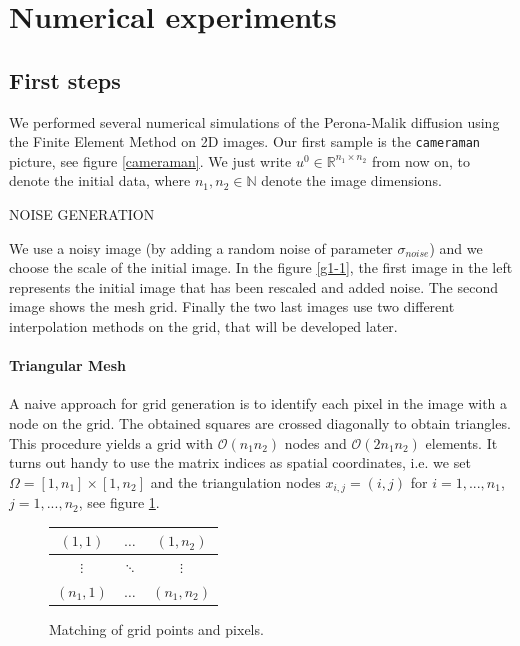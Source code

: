 \documentclass{report}
\renewcommand\O{\mathcal{O}}
\def\N{\mathbb{N}}
\def\R{\mathbb{R}}
\begin{document}
\section{Numerical experiments}

\subsection{First steps} 

We performed several numerical simulations of the Perona-Malik diffusion using the Finite Element Method on 2D images. Our first sample is the \texttt{cameraman} picture, see figure \ref{cameraman}. We just write $u^0 \in \R^{n_1 \times n_2}$ from now on, to denote the initial data, where $n_1, n_2 \in \N$ denote the image dimensions.

NOISE GENERATION

We use a noisy image (by adding a random noise of parameter ${\sigma}_{noise}$) and we choose the scale of the initial image. In the figure \ref{g1-1}, the first image in the left represents the initial image that has been rescaled and added noise. The second image shows the mesh grid. Finally the two last images use two different interpolation methods on the grid, that will be developed later. \\

\paragraph{Triangular Mesh}

A naive approach for grid generation is to identify each pixel in the image with a node on the grid. The obtained squares are crossed diagonally to obtain triangles. This procedure yields a grid with $\O(n_1 n_2)$ nodes and $\O(2 n_1 n_2)$ elements. It turns out handy to use the matrix indices as spatial coordinates, i.e. we set $\Omega = [1,n_1] \times [1,n_2]$ and the triangulation nodes $x_{i,j} = (i,j)$ for $i=1,...,n_1$, $j=1,...,n_2$, see figure \ref{gridptpix}.
\begin{figure}[h]
	\centering
	\begin{tabular}{|c|c|c|}
		\hline		
		$(1,1)$ & $\hdots$ & $(1,n_2)$ \\ \hline
		$\vdots$ & $\ddots$ & $\vdots$ \\ \hline
		$(n_1,1)$ & $\hdots$ & $(n_1,n_2)$ \\ \hline
	\end{tabular}
	\caption{Matching of grid points and pixels.}
	\label{gridptpix}
\end{figure}
\end{document}
